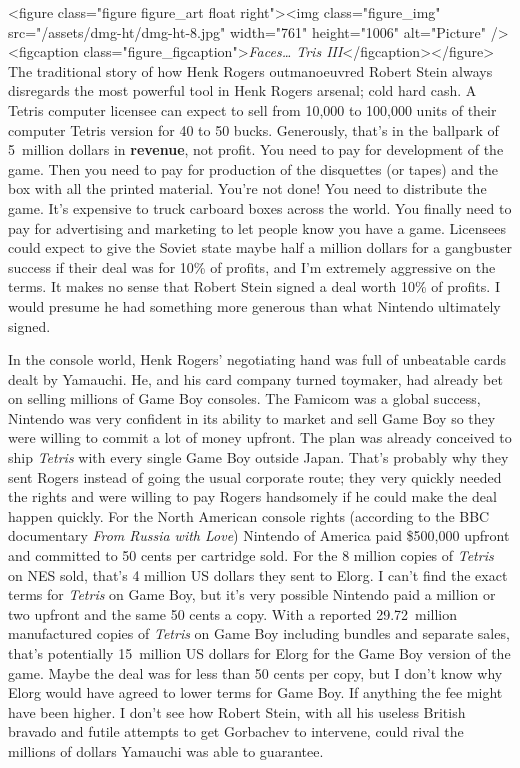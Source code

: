 \documentclass{book}
\begin{document}
<figure class="figure figure_art float right"><img class="figure_img" src="/assets/dmg-ht/dmg-ht-8.jpg" width="761" height="1006" alt="Picture" /><figcaption class="figure_figcaption">\emph{Faces… Tris III}</figcaption></figure>
The traditional story of how Henk Rogers outmanoeuvred Robert Stein always disregards the most powerful tool in Henk Rogers arsenal; cold hard cash. A Tetris computer licensee can expect to sell from 10,000 to 100,000 units of their computer Tetris version for 40 to 50 bucks. Generously, that’s in the ballpark of 5 million dollars in \textbf{revenue}, not profit. You need to pay for development of the game. Then you need to pay for production of the disquettes (or tapes) and the box with all the printed material. You’re not done! You need to distribute the game. It’s expensive to truck carboard boxes across the world. You finally need to pay for advertising and marketing to let people know you have a game. Licensees could expect to give the Soviet state maybe half a million dollars for a gangbuster success if their deal was for 10\% of profits, and I’m extremely aggressive on the terms. It makes no sense that Robert Stein signed a deal worth 10\% of profits. I would presume he had something more generous than what Nintendo ultimately signed.

In the console world, Henk Rogers’ negotiating hand was full of unbeatable cards dealt by Yamauchi. He, and his card company turned toymaker, had already bet on selling millions of Game Boy consoles. The Famicom was a global success, Nintendo was very confident in its ability to market and sell Game Boy so they were willing to commit a lot of money upfront. The plan was already conceived to ship \emph{Tetris} with every single Game Boy outside Japan. That’s probably why they sent Rogers instead of going the usual corporate route; they very quickly needed the rights and were willing to pay Rogers handsomely if he could make the deal happen quickly. For the North American console rights (according to the BBC documentary \emph{From Russia with Love}) Nintendo of America paid \$500,000 upfront and committed to 50 cents per cartridge sold. For the 8 million copies of \emph{Tetris} on NES sold, that’s 4 million US dollars they sent to Elorg. I can’t find the exact terms for \emph{Tetris} on Game Boy, but it’s very possible Nintendo paid a million or two upfront and the same 50 cents a copy. With a reported 29.72 million manufactured copies of \emph{Tetris} on Game Boy including bundles and separate sales, that’s potentially 15 million US dollars for Elorg for the Game Boy version of the game. Maybe the deal was for less than 50 cents per copy, but I don’t know why Elorg would have agreed to lower terms for Game Boy. If anything the fee might have been higher. I don’t see how Robert Stein, with all his useless British bravado and futile attempts to get Gorbachev to intervene, could rival the millions of dollars Yamauchi was able to guarantee.
\end{document}

